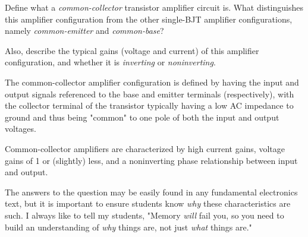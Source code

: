 

Define what a {\it common-collector} transistor amplifier circuit is.  What distinguishes this amplifier configuration from the other single-BJT amplifier configurations, namely {\it common-emitter} and {\it common-base}?

Also, describe the typical gains (voltage and current) of this amplifier configuration, and whether it is {\it inverting} or {\it noninverting}.







The common-collector amplifier configuration is defined by having the input and output signals referenced to the base and emitter terminals (respectively), with the collector terminal of the transistor typically having a low AC impedance to ground and thus being "common" to one pole of both the input and output voltages.  

Common-collector amplifiers are characterized by high current gains, voltage gains of 1 or (slightly) less, and a noninverting phase relationship between input and output.







The answers to the question may be easily found in any fundamental electronics text, but it is important to ensure students know {\it why} these characteristics are such.  I always like to tell my students, "Memory {\it will} fail you, so you need to build an understanding of {\it why} things are, not just {\it what} things are."




